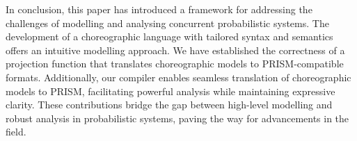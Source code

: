 In conclusion, this paper has introduced a framework for addressing
the challenges of modelling and analysing concurrent probabilistic
systems.
The development of a choreographic language with tailored syntax and
semantics offers an intuitive modelling approach. We have established
the correctness of a projection function that translates choreographic
models to PRISM-compatible formats. Additionally, our compiler enables
seamless translation of choreographic models to PRISM, facilitating
powerful analysis while maintaining expressive clarity. These
contributions bridge the gap between high-level modelling and robust
analysis in probabilistic systems, paving the way for advancements in
the field. 

